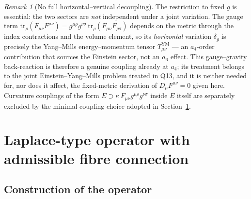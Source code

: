 \documentclass[12pt,a4paper]{article}
\theoremstyle{remark}
\newtheorem*{remark}{Remark}
\theoremstyle{plain}
\theoremstyle{definition}
\begin{document}
      \begin{remark}[No full horizontal--vertical decoupling]
        \label{rem:no-full-decoupling}
        The restriction to fixed $g$ is essential: the two sectors are
        \emph{not} independent under a joint variation.
        The gauge term $\mathrm{tr}_\rho(F_{\mu\nu}F^{\mu\nu})
        = g^{\mu\rho}g^{\nu\sigma}\,
        \mathrm{tr}_\rho(F_{\mu\nu}F_{\rho\sigma})$ depends on the
        metric through the index contractions and the volume element,
        so its \emph{horizontal} variation $\delta_g$ is precisely the
        Yang--Mills energy--momentum tensor
        $T^{\mathrm{YM}}_{\mu\nu}$ --- an $a_4$-order contribution that
        sources the Einstein sector, not an $a_6$ effect.
        This gauge--gravity back-reaction is therefore a genuine
        coupling already at $a_4$; its treatment belongs to the joint
        Einstein--Yang--Mills problem treated in Q13, and it is
        neither needed for, nor does it affect, the fixed-metric
        derivation of $D_\mu F^{\mu\nu} = 0$ given here.
        Curvature couplings of the form
        $E \supset \kappa\,F_{\mu\nu}g^{\mu\rho}g^{\nu\sigma}$ inside
        $E$ itself are separately excluded by the minimal-coupling
        choice adopted in Section~\ref{sec:operator}.
      \end{remark}

  \section{Laplace-type operator with admissible fibre connection}
    \label{sec:operator}

    \subsection{Construction of the operator}
      \label{subsec:operator-construction}
\end{document}
